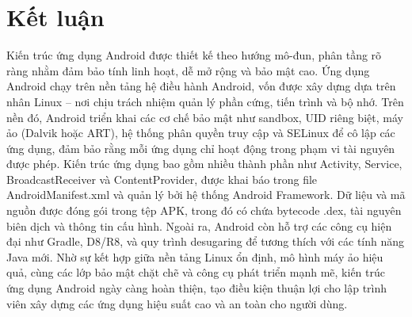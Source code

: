 \section{Kết luận}
    Kiến trúc ứng dụng Android được thiết kế theo hướng mô-đun, phân tầng rõ ràng nhằm đảm bảo tính linh hoạt, dễ mở rộng và bảo mật cao. Ứng dụng Android chạy trên nền tảng hệ điều hành Android, vốn được xây dựng dựa trên nhân Linux – nơi chịu trách nhiệm quản lý phần cứng, tiến trình và bộ nhớ. Trên nền đó, Android triển khai các cơ chế bảo mật như sandbox, UID riêng biệt, máy ảo (Dalvik hoặc ART), hệ thống phân quyền truy cập và SELinux để cô lập các ứng dụng, đảm bảo rằng mỗi ứng dụng chỉ hoạt động trong phạm vi tài nguyên được phép. Kiến trúc ứng dụng bao gồm nhiều thành phần như Activity, Service, BroadcastReceiver và ContentProvider, được khai báo trong file AndroidManifest.xml và quản lý bởi hệ thống Android Framework. Dữ liệu và mã nguồn được đóng gói trong tệp APK, trong đó có chứa bytecode .dex, tài nguyên biên dịch và thông tin cấu hình. Ngoài ra, Android còn hỗ trợ các công cụ hiện đại như Gradle, D8/R8, và quy trình desugaring để tương thích với các tính năng Java mới. Nhờ sự kết hợp giữa nền tảng Linux ổn định, mô hình máy ảo hiệu quả, cùng các lớp bảo mật chặt chẽ và công cụ phát triển mạnh mẽ, kiến trúc ứng dụng Android ngày càng hoàn thiện, tạo điều kiện thuận lợi cho lập trình viên xây dựng các ứng dụng hiệu suất cao và an toàn cho người dùng.\\

